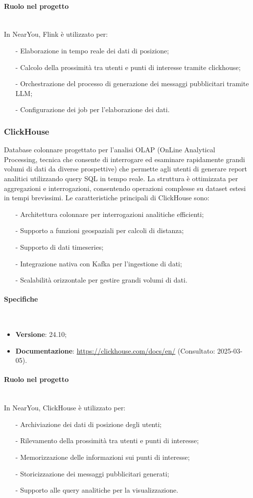 \documentclass[10pt]{article}
\newcommand{\myparagraph}[1]{\paragraph{#1}\mbox{}\\}
\begin{document}
\myparagraph{Ruolo nel progetto}
In NearYou, Flink è utilizzato per:
\begin{itemize}
    \item[-] Elaborazione in tempo reale dei dati di posizione;
    \item[-] Calcolo della prossimità tra utenti e punti di interesse tramite clickhouse;
    \item[-] Orchestrazione del processo di generazione dei messaggi pubblicitari tramite LLM;
    \item[-] Configurazione dei job per l'elaborazione dei dati.
\end{itemize}

\subsubsection{ClickHouse}
Database colonnare progettato per l'analisi OLAP (OnLine Analytical Processing, tecnica che consente di interrogare ed esaminare rapidamente grandi volumi di dati da diverse prospettive) che permette agli utenti di generare report analitici utilizzando query SQL in tempo reale.
La struttura è ottimizzata per aggregazioni e interrogazioni, consentendo operazioni complesse su dataset estesi in tempi brevissimi.
Le caratteristiche principali di ClickHouse sono:
\begin{itemize}
    \item[-] Architettura colonnare per interrogazioni analitiche efficienti;
    \item[-] Supporto a funzioni geospaziali per calcoli di distanza;
    \item[-] Supporto di dati timeseries;
    \item[-] Integrazione nativa con Kafka per l'ingestione di dati;
    \item[-] Scalabilità orizzontale per gestire grandi volumi di dati.
\end{itemize}


\myparagraph{Specifiche}
\begin{itemize}
    \item \textbf{Versione}: 24.10;
    \item \textbf{Documentazione}: \textcolor{blue}{\url{https://clickhouse.com/docs/en/}} (Consultato: 2025-03-05).
\end{itemize}

\myparagraph{Ruolo nel progetto}
In NearYou, ClickHouse è utilizzato per:
\begin{itemize}
    \item[-] Archiviazione dei dati di posizione degli utenti;
    \item[-] Rilevamento della prossimità tra utenti e punti di interesse;
    \item[-] Memorizzazione delle informazioni sui punti di interesse;
    \item[-] Storicizzazione dei messaggi pubblicitari generati;
    \item[-] Supporto alle query analitiche per la visualizzazione.
\end{itemize}
\end{document}
